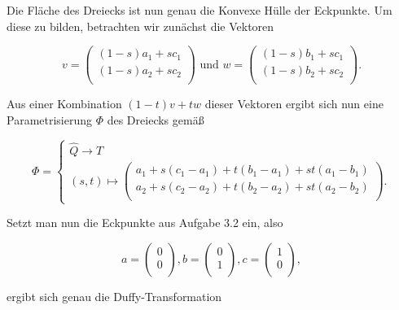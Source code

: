 \documentclass[a4paper,11pt,bibliography=totoc,listof=totoc,headinclude=true,cleardoublepage=empty,oneside]{scrbook}
\begin{document}
\noindent Die Fläche des Dreiecks ist nun genau die Konvexe Hülle der Eckpunkte. Um diese zu bilden, betrachten wir zunächst die Vektoren  

\begin{equation*}
	v=\left(
	\begin{array}{ccc}
	(1-s)a_1+ sc_1\\
	(1-s)a_2+sc_2\\
	\end{array}
	\right) \text{ und } w=\left(
	\begin{array}{ccc}
	(1-s)b_1+ sc_1\\
	(1-s)b_2+sc_2\\
	\end{array}
	\right). 
\end{equation*}

\noindent Aus einer Kombination $(1-t)v+tw$ dieser Vektoren ergibt sich nun eine Parametrisierung $\Phi$ des Dreiecks gemäß 

\begin{equation*}
	\Phi = \begin{cases} 
	\hat{Q} \to T \\
	(s,t) \mapsto \left(
	\begin{array}{ccc}
	a_1 + s(c_1-a_1)+ t(b_1-a_1) + st(a_1-b_1)\\
	a_2 + s(c_2-a_2) + t(b_2-a_2) + st(a_2-b_2)\\
	\end{array}
	\right).
	\end{cases}
\end{equation*}


\noindent Setzt man nun die Eckpunkte  aus Aufgabe 3.2 ein, also 

\begin{equation*}
	a=\left(
	\begin{array}{ccc}
	0 \\
	0\\
	\end{array}
	\right), b=\left(
	\begin{array}{ccc}
	0 \\
	1\\
	\end{array}
	\right), c=\left(
	\begin{array}{ccc}
	1\\
	0\\
	\end{array}
	\right),
\end{equation*}

\noindent ergibt sich genau die  Duffy-Transformation
\end{document}
